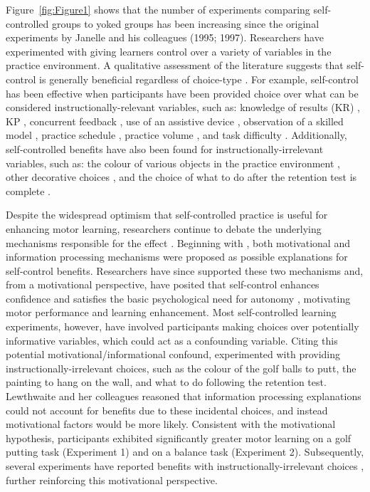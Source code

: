 \documentclass[man,floatsintext,hidelinks]{apa7}
\begin{document}
Figure~\ref{fig:Figure1} shows that the number of experiments comparing self-controlled groups to yoked groups has been increasing since the original experiments by Janelle and his colleagues (1995; 1997). Researchers have experimented with giving learners control over a variety of variables in the practice environment. A qualitative assessment of the literature suggests that self-control is generally beneficial regardless of choice-type \parencite{Wulf2016-gf}. For example, self-control has been effective when participants have been provided choice over what can be considered instructionally-relevant variables, such as: knowledge of results (KR) \parencite{Patterson2010-tk}, KP \parencite{Lim2015-qs}, concurrent feedback \parencite{Huet2009-wu}, use of an assistive device \parencite{Wulf2001-nb}, observation of a skilled model \parencite{Lemos2017-qx}, practice schedule \parencite{Wu2011-ha}, practice volume \parencite{Lessa2015-eq}, and task difficulty \parencite{Leiker2016-zd}. Additionally, self-controlled benefits have also been found for instructionally-irrelevant variables, such as: the colour of various objects in the practice environment \parencite{Wulf2018-ie}, other decorative choices \parencite{Iwatsuki2019-tf}, and the choice of what to do after the retention test is complete \parencite{Lewthwaite2015-bd}.

Despite the widespread optimism that self-controlled practice is useful for enhancing motor learning, researchers continue to debate the underlying mechanisms responsible for the effect \parencite{Carter2017-mk,Wulf2018-ie}. Beginning with \Textcite{Janelle1995-rj}, both motivational and information processing mechanisms were proposed as possible explanations for self-control benefits. Researchers have since supported these two mechanisms and, from a motivational perspective, have posited that self-control enhances confidence \parencite{Janelle1995-rj,Chiviacowsky2012-cw,Wulf2016-gf} and satisfies the basic psychological need for autonomy \parencite{Sanli2013-xn,Wulf2016-gf}, motivating motor performance and learning enhancement. Most self-controlled learning experiments, however, have involved participants making choices over potentially informative variables, which could act as a confounding variable. Citing this potential motivational/informational confound, \Textcite{Lewthwaite2015-bd} experimented with providing instructionally-irrelevant choices, such as the colour of the golf balls to putt, the painting to hang on the wall, and what to do following the retention test. Lewthwaite and her colleagues reasoned that information processing explanations could not account for benefits due to these incidental choices, and instead motivational factors would be more likely. Consistent with the motivational hypothesis, participants exhibited significantly greater motor learning on a golf putting task (Experiment 1) and on a balance task (Experiment 2). Subsequently, several experiments have reported benefits with instructionally-irrelevant choices \parencite{Abdollahipour2017-dr,Chua2018-sn,Halperin2017-az,Iwatsuki2019-tf,Wulf2014-sn,Wulf2018-ie}, further reinforcing this motivational perspective.
\end{document}
